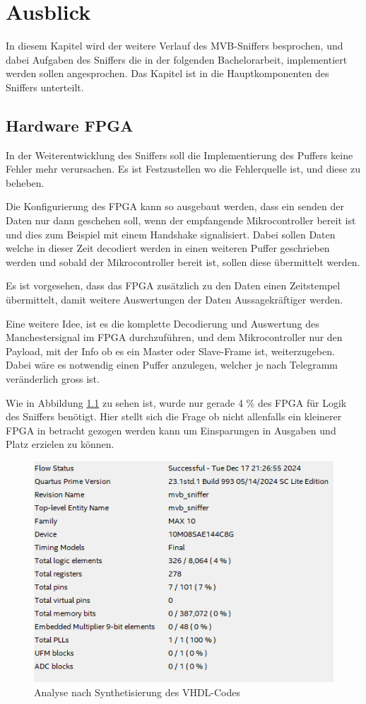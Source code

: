 \chapter{Ausblick} %
\label{chapter6:Ausblick} %

In diesem Kapitel wird der weitere Verlauf des MVB-Sniffers besprochen, und dabei Aufgaben des Sniffers die in der folgenden Bachelorarbeit, implementiert werden sollen angesprochen.
Das Kapitel ist in die Hauptkomponenten des Sniffers unterteilt.


\section{Hardware FPGA}
\label{sec:AusblickHardwareFPGA}
In der Weiterentwicklung des Sniffers soll die Implementierung des Puffers keine Fehler mehr verursachen. Es ist Festzustellen wo die Fehlerquelle ist, und diese zu beheben.

Die Konfigurierung des FPGA kann so ausgebaut werden, dass ein senden der Daten nur dann geschehen soll, wenn der empfangende Mikrocontroller bereit ist und dies zum Beispiel mit einem Handshake signalisiert. Dabei sollen Daten welche in dieser Zeit decodiert werden in einen weiteren Puffer geschrieben werden und sobald der Mikrocontroller bereit ist, sollen diese übermittelt werden.

Es ist vorgesehen, dass das FPGA zusätzlich zu den Daten einen Zeitstempel übermittelt, damit weitere Auswertungen der Daten Aussagekräftiger werden.

Eine weitere Idee, ist es die komplette Decodierung und Auswertung des Manchestersignal im FPGA durchzuführen, und dem Mikrocontroller nur den Payload, mit der Info ob es ein Master oder Slave-Frame ist, weiterzugeben. Dabei wäre es notwendig einen Puffer anzulegen, welcher je nach Telegramm veränderlich gross ist. 

Wie in Abbildung \ref{fig:FPGAanalyse} zu sehen ist, wurde nur gerade 4 \% des FPGA für Logik des Sniffers benötigt. Hier stellt sich die Frage ob nicht allenfalls ein kleinerer FPGA in betracht gezogen werden kann um Einsparungen in Ausgaben und Platz erzielen zu können.\\

\begin{figure}[H]
    \centering
    \includegraphics[width=0.55\linewidth]{Figures/Chap6/FPGA/quartus_analyzer.PNG}
    \caption{Analyse nach Synthetisierung des VHDL-Codes}
    \label{fig:FPGAanalyse}
\end{figure}



